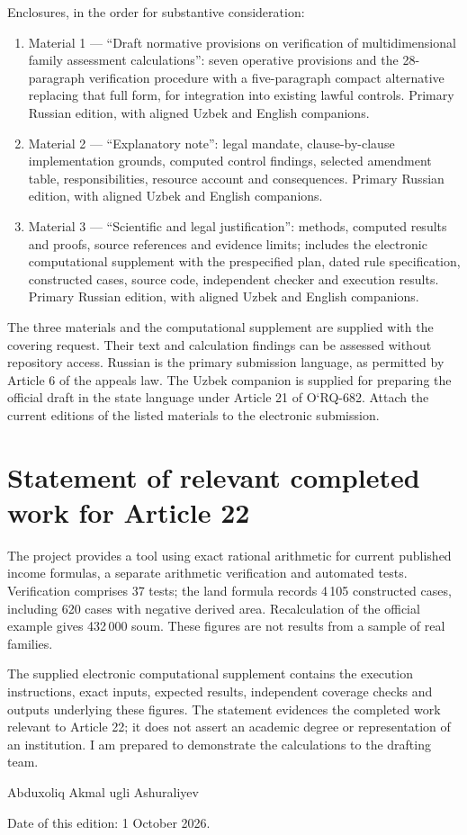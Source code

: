 \documentclass[14pt,a4paper]{extarticle}
\begin{document}
Enclosures, in the order for substantive consideration:
\begin{enumerate}
\item Material 1 — “Draft normative provisions on verification of multidimensional family assessment calculations”: seven operative provisions and the 28-paragraph verification procedure with a five-paragraph compact alternative replacing that full form, for integration into existing lawful controls. Primary Russian edition, with aligned Uzbek and English companions.
\item Material 2 — “Explanatory note”: legal mandate, clause-by-clause implementation grounds, computed control findings, selected amendment table, responsibilities, resource account and consequences. Primary Russian edition, with aligned Uzbek and English companions.
\item Material 3 — “Scientific and legal justification”: methods, computed results and proofs, source references and evidence limits; includes the electronic computational supplement with the prespecified plan, dated rule specification, constructed cases, source code, independent checker and execution results. Primary Russian edition, with aligned Uzbek and English companions.
\end{enumerate}
The three materials and the computational supplement are supplied with the covering request. Their text and calculation findings can be assessed without repository access. Russian is the primary submission language, as permitted by Article 6 of the appeals law. The Uzbek companion is supplied for preparing the official draft in the state language under Article 21 of O‘RQ-682. Attach the current editions of the listed materials to the electronic submission.
\section*{Statement of relevant completed work for Article 22}
The project provides a tool using exact rational arithmetic for current published income formulas, a separate arithmetic verification and automated tests. Verification comprises 37 tests; the land formula records 4\,105 constructed cases, including 620 cases with negative derived area. Recalculation of the official example gives 432\,000 soum. These figures are not results from a sample of real families.

The supplied electronic computational supplement contains the execution instructions, exact inputs, expected results, independent coverage checks and outputs underlying these figures. The statement evidences the completed work relevant to Article 22; it does not assert an academic degree or representation of an institution. I am prepared to demonstrate the calculations to the drafting team.

Abduxoliq Akmal ugli Ashuraliyev\par
Date of this edition: 1 October 2026.
\end{document}
